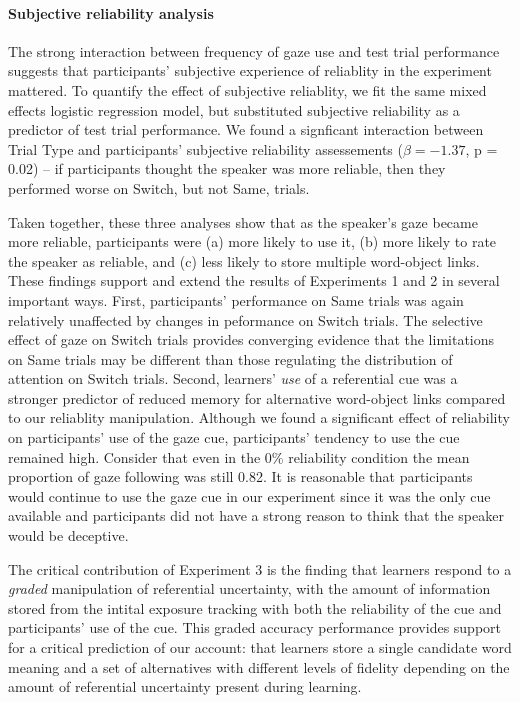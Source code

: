 \documentclass[authoryear, review]{elsarticle}
\begin{document}
\paragraph{Subjective reliability
analysis}\label{subjective-reliability-analysis}

The strong interaction between frequency of gaze use and test trial
performance suggests that participants' subjective experience of
reliablity in the experiment mattered. To quantify the effect of
subjective reliablity, we fit the same mixed effects logistic regression
model, but substituted subjective reliability as a predictor of test
trial performance. We found a signficant interaction between Trial Type
and participants' subjective reliability assessements
(\(\beta = -1.37\), p = 0.02) -- if participants thought the speaker was
more reliable, then they performed worse on Switch, but not Same,
trials.

Taken together, these three analyses show that as the speaker's gaze
became more reliable, participants were (a) more likely to use it, (b)
more likely to rate the speaker as reliable, and (c) less likely to
store multiple word-object links. These findings support and extend the
results of Experiments 1 and 2 in several important ways. First,
participants' performance on Same trials was again relatively unaffected
by changes in peformance on Switch trials. The selective effect of gaze
on Switch trials provides converging evidence that the limitations on
Same trials may be different than those regulating the distribution of
attention on Switch trials. Second, learners' \emph{use} of a
referential cue was a stronger predictor of reduced memory for
alternative word-object links compared to our reliablity manipulation.
Although we found a significant effect of reliability on participants'
use of the gaze cue, participants' tendency to use the cue remained
high. Consider that even in the 0\% reliability condition the mean
proportion of gaze following was still 0.82. It is reasonable that
participants would continue to use the gaze cue in our experiment since
it was the only cue available and participants did not have a strong
reason to think that the speaker would be deceptive.

The critical contribution of Experiment 3 is the finding that learners
respond to a \emph{graded} manipulation of referential uncertainty, with
the amount of information stored from the intital exposure tracking with
both the reliability of the cue and participants' use of the cue. This
graded accuracy performance provides support for a critical prediction
of our account: that learners store a single candidate word meaning and
a set of alternatives with different levels of fidelity depending on the
amount of referential uncertainty present during learning.
\end{document}
